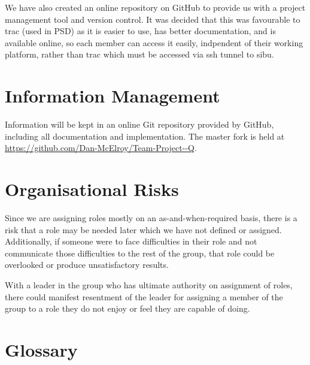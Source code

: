 \documentclass{l3deliverable}
\begin{document}
We have also created an online repository on GitHub to provide us with
a project management tool and version control.
It was decided that this was favourable to trac (used in PSD) as it is easier
to use, has better documentation, and is available online, so each member can
access it easily, indpendent of their working platform, rather than
trac which must be accessed via ssh tunnel to sibu.


\section{Information Management}

Information will be kept in an online Git repository provided by GitHub,
including all documentation and implementation. The master fork is
held at \url{https://github.com/Dan-McElroy/Team-Project--Q}.


\section{Organisational Risks}

Since we are assigning roles mostly on an as-and-when-required basis, there is
a risk that a role may be needed later which we have not defined or assigned.
Additionally, if someone were to face difficulties in their role and not 
communicate those difficulties to the rest of the group, that role could be 
overlooked or produce unsatisfactory results.

With a leader in the group who has ultimate authority on assignment of roles,
there could manifest resentment of the leader for assigning a member of the 
group to a role they do not enjoy or feel they are capable of doing.


\appendix

\section{Glossary}



\end{document}

